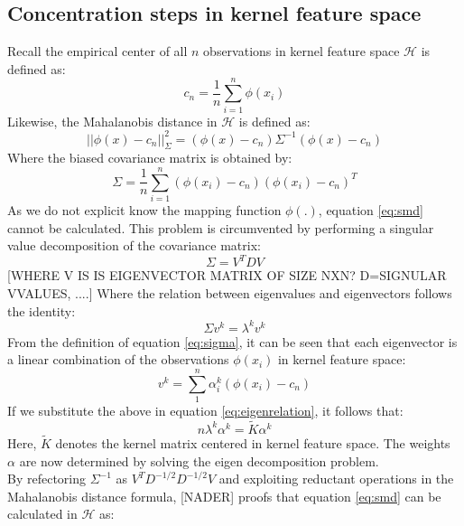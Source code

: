 \documentclass[preprint,12pt]{elsarticle}
\begin{document}
\subsection{Concentration steps in kernel feature space}
Recall the empirical center of all $n$ observations in kernel feature space $\mathcal{H}$ is defined as:
\begin{equation}
	\label{eq:center}
	c_n = \frac{1}{n} \sum_{i=1}^{n}\phi(x_i)
\end{equation}
Likewise, the Mahalanobis distance in $\mathcal{H}$ is defined as:
\begin{equation}
	\label{eq:smd}
	||\phi(x) - c_n||^2_{\Sigma} = (\phi(x) - c_n) \Sigma^{-1} (\phi(x) - c_n)
\end{equation}
Where the biased covariance matrix is obtained by:
\begin{equation}
	\Sigma = \frac{1}{n} \sum_{i=1}^{n} (\phi(x_i) - c_n) (\phi(x_i) - c_n)^T
	\label{eq:sigma}
\end{equation}
As we do not explicit know the mapping function $\phi(.)$, equation \ref{eq:smd} cannot be calculated. This problem is circumvented by performing a singular value decomposition of the covariance matrix:
\begin{equation}
	\Sigma = V^T D V
\end{equation}
[WHERE V IS IS EIGENVECTOR MATRIX OF SIZE NXN? D=SIGNULAR VVALUES, ....]
Where the relation between eigenvalues and eigenvectors follows the identity:
\begin{equation}
	\label{eq:eigenrelation}
	\Sigma v^k = \lambda^k v^k
\end{equation} 
From the definition of equation \ref{eq:sigma}, it can be seen that each eigenvector is a linear combination of the observations $\phi(x_i)$ in kernel feature space:
\begin{equation}
v^k = \sum_{1}^{n} \alpha_i^k ( \phi(x_i) - c_n) 
\end{equation}
If we substitute the above in equation \ref{eq:eigenrelation}, it follows that:
\begin{equation}
	n \lambda^k \alpha^k = \tilde{K} \alpha^k
\end{equation}
Here, $\tilde{K}$ denotes the kernel matrix centered in kernel feature space. The weights $\alpha$ are now determined by solving the eigen decomposition problem. \\
By refectoring $\Sigma^{-1}$ as $V^T D^{-1/2} D^{-1/2} V$ and exploiting reductant operations in the Mahalanobis distance formula, [NADER] proofs that equation \ref{eq:smd} can be calculated in $\mathcal{H}$ as:
\end{document}
